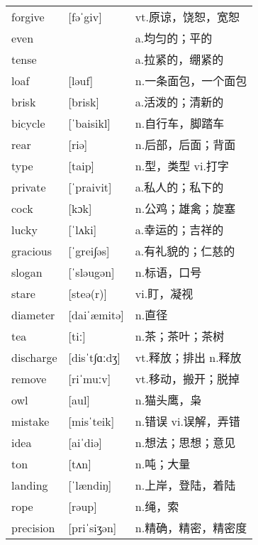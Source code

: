 \documentclass[a4paper]{article}
\begin{document}
\section{}
\begin{tabular}{l l l}

forgive & [fəˈgiv] & vt.原谅，饶恕，宽恕 \\
even &  & a.均匀的；平的 \\
tense &  & a.拉紧的，绷紧的 \\
loaf & [ləuf] & n.一条面包，一个面包 \\
brisk & [brisk] & a.活泼的；清新的 \\
bicycle & [ˈbaisikl] & n.自行车，脚踏车 \\
rear & [riə] & n.后部，后面；背面 \\
type & [taip] & n.型，类型 vi.打字 \\
private & [ˈpraivit] & a.私人的；私下的 \\
cock & [kɔk] & n.公鸡；雄禽；旋塞 \\
lucky & [ˈlʌki] & a.幸运的；吉祥的 \\
gracious & [ˈgrei∫əs] & a.有礼貌的；仁慈的 \\
slogan & [ˈsləugən] & n.标语，口号 \\
stare & [steə(r)] & vi.盯，凝视 \\
diameter & [daiˈæmitə] & n.直径 \\
tea & [tiː] & n.茶；茶叶；茶树 \\
discharge & [disˈt∫ɑːdʒ] & vt.释放；排出 n.释放 \\
remove & [riˈmuːv] & vt.移动，搬开；脱掉 \\
owl & [aul] & n.猫头鹰，枭 \\
mistake & [misˈteik] & n.错误 vi.误解，弄错 \\
idea & [aiˈdiə] & n.想法；思想；意见 \\
ton & [tʌn] & n.吨；大量 \\
landing & [ˈlændiŋ] & n.上岸，登陆，着陆 \\
rope & [rəup] & n.绳，索 \\
precision & [priˈsiʒən] & n.精确，精密，精密度 \\

\end{tabular}
\end{document}
